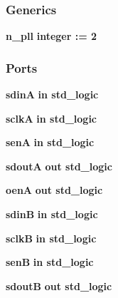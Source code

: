 \subsubsection*{Generics}
 \begin{DoxyCompactItemize}
\item 
{\bf n\+\_\+pll} {\bfseries {\bfseries \textcolor{comment}{integer}\textcolor{vhdlchar}{ }\textcolor{vhdlchar}{ }\textcolor{vhdlchar}{\+:}\textcolor{vhdlchar}{=}\textcolor{vhdlchar}{ }\textcolor{vhdlchar}{ } \textcolor{vhdldigit}{2} \textcolor{vhdlchar}{ }}}
\end{DoxyCompactItemize}
\subsubsection*{Ports}
 \begin{DoxyCompactItemize}
\item 
{\bf sdinA}  {\bfseries {\bfseries \textcolor{keywordflow}{in}\textcolor{vhdlchar}{ }}} {\bfseries \textcolor{comment}{std\+\_\+logic}\textcolor{vhdlchar}{ }} 
\item 
{\bf sclkA}  {\bfseries {\bfseries \textcolor{keywordflow}{in}\textcolor{vhdlchar}{ }}} {\bfseries \textcolor{comment}{std\+\_\+logic}\textcolor{vhdlchar}{ }} 
\item 
{\bf senA}  {\bfseries {\bfseries \textcolor{keywordflow}{in}\textcolor{vhdlchar}{ }}} {\bfseries \textcolor{comment}{std\+\_\+logic}\textcolor{vhdlchar}{ }} 
\item 
{\bf sdoutA}  {\bfseries {\bfseries \textcolor{keywordflow}{out}\textcolor{vhdlchar}{ }}} {\bfseries \textcolor{comment}{std\+\_\+logic}\textcolor{vhdlchar}{ }} 
\item 
{\bf oenA}  {\bfseries {\bfseries \textcolor{keywordflow}{out}\textcolor{vhdlchar}{ }}} {\bfseries \textcolor{comment}{std\+\_\+logic}\textcolor{vhdlchar}{ }} 
\item 
{\bf sdinB}  {\bfseries {\bfseries \textcolor{keywordflow}{in}\textcolor{vhdlchar}{ }}} {\bfseries \textcolor{comment}{std\+\_\+logic}\textcolor{vhdlchar}{ }} 
\item 
{\bf sclkB}  {\bfseries {\bfseries \textcolor{keywordflow}{in}\textcolor{vhdlchar}{ }}} {\bfseries \textcolor{comment}{std\+\_\+logic}\textcolor{vhdlchar}{ }} 
\item 
{\bf senB}  {\bfseries {\bfseries \textcolor{keywordflow}{in}\textcolor{vhdlchar}{ }}} {\bfseries \textcolor{comment}{std\+\_\+logic}\textcolor{vhdlchar}{ }} 
\item 
{\bf sdoutB}  {\bfseries {\bfseries \textcolor{keywordflow}{out}\textcolor{vhdlchar}{ }}} {\bfseries \textcolor{comment}{std\+\_\+logic}\textcolor{vhdlchar}{ }} 

\end{DoxyCompactItemize}
